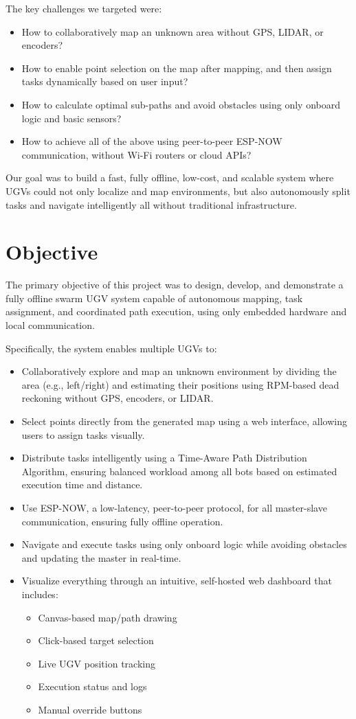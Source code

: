 \documentclass[a4paper,12pt]{report}
\begin{document}
The key challenges we targeted were:
\begin{itemize}
    \item How to collaboratively map an unknown area without GPS, LIDAR, or encoders?
    \item How to enable point selection on the map after mapping, and then assign tasks dynamically based on user input?
    \item How to calculate optimal sub-paths and avoid obstacles using only onboard logic and basic sensors?
    \item How to achieve all of the above using peer-to-peer ESP-NOW communication, without Wi-Fi routers or cloud APIs?
\end{itemize}

Our goal was to build a fast, fully offline, low-cost, and scalable system where UGVs could not only localize and map environments, but also autonomously split tasks and navigate intelligently all without traditional infrastructure.
 \newpage

\section{Objective}
The primary objective of this project was to design, develop, and demonstrate a fully offline swarm UGV system capable of autonomous mapping, task assignment, and coordinated path execution, using only embedded hardware and local communication.

Specifically, the system enables multiple UGVs to:
\begin{itemize}
    \item Collaboratively explore and map an unknown environment by dividing the area (e.g., left/right) and estimating their positions using RPM-based dead reckoning without GPS, encoders, or LIDAR.
    \item Select points directly from the generated map using a web interface, allowing users to assign tasks visually.
    \item Distribute tasks intelligently using a Time-Aware Path Distribution Algorithm, ensuring balanced workload among all bots based on estimated execution time and distance.
    \item Use ESP-NOW, a low-latency, peer-to-peer protocol, for all master-slave communication, ensuring fully offline operation.
    \item Navigate and execute tasks using only onboard logic while avoiding obstacles and updating the master in real-time.
    \item Visualize everything through an intuitive, self-hosted web dashboard that includes:
    \begin{itemize}
        \item Canvas-based map/path drawing
        \item Click-based target selection
        \item Live UGV position tracking
        \item Execution status and logs
        \item Manual override buttons
    \end{itemize}
\end{itemize}
\end{document}
